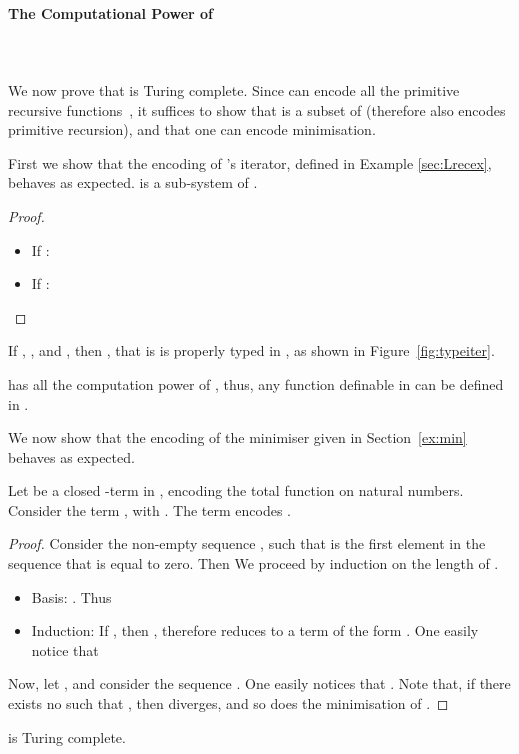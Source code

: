 \documentclass{article}
\begin{document}
\paragraph*{The Computational Power of \LLCIrec}\label{sec:LLCIrecpow}\ \\\ \\
We now prove that \LLCIrec is Turing complete. Since  \LLCI can encode all the primitive recursive functions~\cite{AlvesS:phd,AlvesS:TCS}, it suffices to show that \LLCI is a subset of  (therefore  also encodes primitive recursion), and that one can encode minimisation.

First we show that the encoding of \LLCI's iterator, defined in Example \ref{sec:Lrecex},  behaves 
as expected. \LLCI is a sub-system of .
\begin{proposition}

\end{proposition}
\begin{proof}
\begin{itemize}
\item If :

\item If :

\end{itemize}
\end{proof}
If , , and , then ,
that is  is properly typed in \LLCIrec, as shown in
Figure~\ref{fig:typeiter}.

\begin{figure*}[t!]

\caption{Type derivation for }\label{fig:typeiter}
\end{figure*}

\begin{corollary}
\LLCIrec has all the computation power of \LLCI, thus, any function definable in \ST can be defined in .
\end{corollary}


We now show that the encoding of the minimiser given in Section~\ref{ex:min}
behaves as expected.

\begin{theorem}
\label{th:mincorrect}
Let  be a closed -term in , encoding the 
total function  on natural numbers. Consider the term , with . The term  encodes .
\end{theorem}

\begin{proof}
Consider the non-empty sequence , such that
 is the first element in the sequence that is equal to
zero. Then  We proceed by induction on the length of .
\begin{itemize}
\item Basis: . Thus 

\item Induction: If , then , therefore  reduces to a term of the form . One easily notice that

\end{itemize}
Now, let , and consider
the sequence . One easily notices that . Note that, if there
exists no  such that , then  diverges, and so does the minimisation of .
\end{proof}
\begin{corollary}
 \LLCIrec is Turing complete.
\end{corollary}
\end{document}
